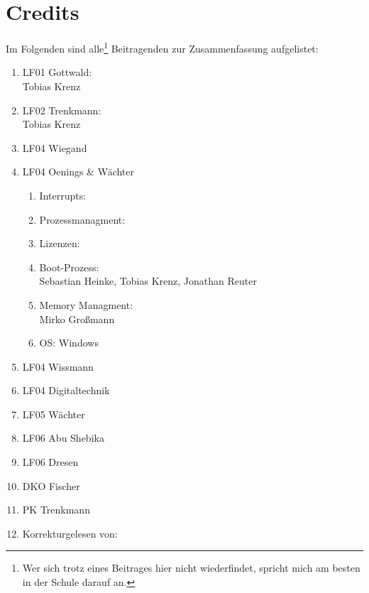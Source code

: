 \section{Credits}
Im Folgenden sind alle\footnote{Wer sich trotz eines Beitrages hier nicht wiederfindet, spricht mich am besten in der Schule darauf an.} Beitragenden zur Zusammenfassung aufgelistet:

\begin{enumerate}
	\item LF01 Gottwald:\\
Tobias Krenz
	\item LF02 Trenkmann:\\
Tobias Krenz
	\item LF04 Wiegand
	\item LF04 Oenings \& Wächter
	\begin{enumerate}
		\item Interrupts:
		\item Prozessmanagment:
		\item Lizenzen:
		\item Boot-Prozess:\\
Sebastian Heinke, Tobias Krenz, Jonathan Reuter
		\item Memory Managment:\\
Mirko Großmann
		\item OS: Windows
	\end{enumerate}
	\item LF04 Wissmann
	\item LF04 Digitaltechnik
	\item LF05 Wächter
	\item LF06 Abu Shebika
	\item LF06 Dresen
	\item DKO Fischer
	\item PK Trenkmann
	\item Korrekturgelesen von:
\end{enumerate}